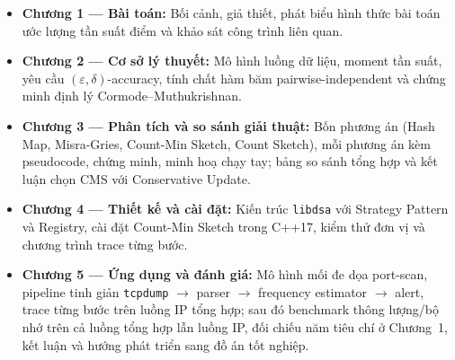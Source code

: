 \begin{itemize}
    \item \textbf{Chương 1 --- Bài toán:} Bối cảnh, giả thiết, phát biểu hình thức bài toán ước lượng tần suất điểm và khảo sát công trình liên quan.
    \item \textbf{Chương 2 --- Cơ sở lý thuyết:} Mô hình luồng dữ liệu, moment tần suất, yêu cầu $(\varepsilon, \delta)$-accuracy, tính chất hàm băm pairwise-independent và chứng minh định lý Cormode--Muthukrishnan.
    \item \textbf{Chương 3 --- Phân tích và so sánh giải thuật:} Bốn phương án (Hash Map, Misra-Gries, Count-Min Sketch, Count Sketch), mỗi phương án kèm pseudocode, chứng minh, minh hoạ chạy tay; bảng so sánh tổng hợp và kết luận chọn CMS với Conservative Update.
    \item \textbf{Chương 4 --- Thiết kế và cài đặt:} Kiến trúc \texttt{libdsa} với Strategy Pattern và Registry, cài đặt Count-Min Sketch trong C++17, kiểm thử đơn vị và chương trình trace từng bước.
    \item \textbf{Chương 5 --- Ứng dụng và đánh giá:} Mô hình mối đe dọa port-scan, pipeline tinh giản \texttt{tcpdump} $\rightarrow$ parser $\rightarrow$ frequency estimator $\rightarrow$ alert, trace từng bước trên luồng IP tổng hợp; sau đó benchmark thông lượng/bộ nhớ trên cả luồng tổng hợp lẫn luồng IP, đối chiếu năm tiêu chí ở Chương~1, kết luận và hướng phát triển sang đồ án tốt nghiệp.
\end{itemize}

